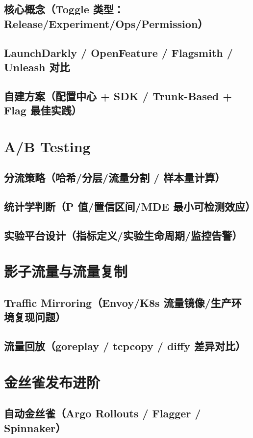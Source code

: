 \documentclass[12pt,UTF8]{ctexbook}
\begin{document}
    \subsection{核心概念（Toggle 类型：Release/Experiment/Ops/Permission）}
    \subsection{LaunchDarkly / OpenFeature / Flagsmith / Unleash 对比}
    \subsection{自建方案（配置中心 + SDK / Trunk-Based + Flag 最佳实践）}

  \section{A/B Testing}
    \subsection{分流策略（哈希/分层/流量分割 / 样本量计算）}
    \subsection{统计学判断（P 值/置信区间/MDE 最小可检测效应）}
    \subsection{实验平台设计（指标定义/实验生命周期/监控告警）}

  \section{影子流量与流量复制}
    \subsection{Traffic Mirroring（Envoy/K8s 流量镜像/生产环境复现问题）}
    \subsection{流量回放（goreplay / tcpcopy / diffy 差异对比）}

  \section{金丝雀发布进阶}
    \subsection{自动金丝雀（Argo Rollouts / Flagger / Spinnaker）}
\end{document}

